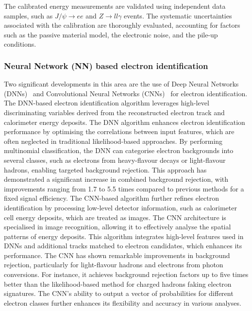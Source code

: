             The calibrated energy measurements are validated using independent data samples, such as $J/\psi \rightarrow ee$ and $Z \rightarrow ll\gamma$ events. 
            The systematic uncertainties associated with the calibration are thoroughly evaluated, accounting for factors such as the passive material model, 
            the electronic noise, and the pile-up conditions. 

        \subsubsection{Neural Network (NN) based electron identification}
            Two significant developments in this area are the use of Deep Neural Networks (DNNs)~\cite{ATL-PHYS-PUB-2022-022} and Convolutional Neural Networks (CNNs)~\cite{ATL-DAPR-PUB-2023-001}
            for electron identification.
            The DNN-based electron identification algorithm leverages high-level discriminating variables derived from the reconstructed electron track and calorimeter 
            energy deposits. The DNN algorithm enhances electron identification performance by optimising the correlations between input features, which are often 
            neglected in traditional likelihood-based approaches. By performing multinomial classification, the DNN can categorise electron backgrounds into several 
            classes, such as electrons from heavy-flavour decays or light-flavour hadrons, enabling targeted background rejection. This approach has demonstrated 
            a significant increase in combined background rejection, with improvements ranging from 1.7 to 5.5 times compared to previous methods for a fixed signal efficiency.
            The CNN-based algorithm further refines electron identification by processing low-level detector information, such as calorimeter cell energy deposits, 
            which are treated as images. The CNN architecture is specialised in image recognition, allowing it to effectively analyse the spatial patterns of energy 
            deposits. This algorithm integrates high-level features used in DNNs and additional tracks matched to electron candidates, which enhances its performance. 
            The CNN has shown remarkable improvements in background rejection, particularly for light-flavour hadrons and electrons from photon conversions. For 
            instance, it achieves background rejection factors up to five times better than the likelihood-based method for charged hadrons faking electron signatures. 
            The CNN's ability to output a vector of probabilities for different electron classes further enhances its flexibility and accuracy in various analyses.

